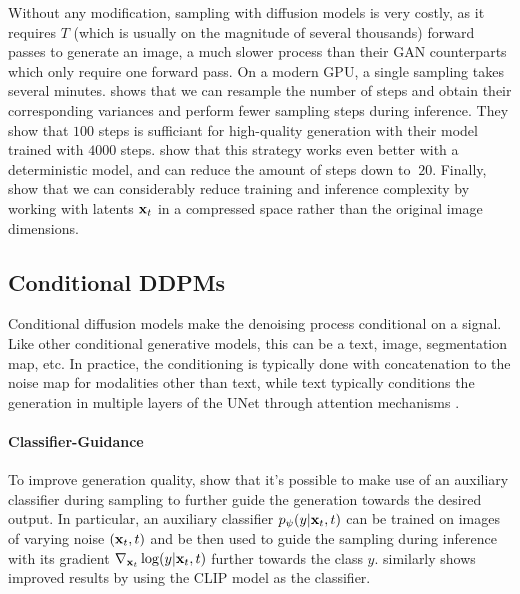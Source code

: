 Without any modification, sampling with diffusion models is very costly, as it requires $T$
(which is usually on the magnitude of several thousands) forward passes to generate an image, a much slower 
process than their \ac{GAN} counterparts which only require one forward pass. On a modern 
GPU, a single sampling takes several minutes. \cite{nichol2021improved} shows that we can 
resample the number of steps and obtain their corresponding variances and perform fewer 
sampling steps during inference. They show that $100$  steps is sufficiant for high-quality 
generation with their model trained with $4000$ steps. \cite{song2021denoising} show that 
this strategy works even better with a deterministic model, and can reduce the amount of steps
down to $~20$. Finally, \cite{rombach2022high} show that we can considerably reduce training and 
inference complexity by working with latents $\mathbf{x}_t$ in a compressed space rather than 
the original image dimensions.

\subsection{Conditional DDPMs}\label{subsection:conditional_ddpm}

Conditional diffusion models \citep{chen2021wavegrad, saharia2022image, saharia2022palette}
make the denoising process conditional on a signal. Like other conditional generative models, 
this can be  a text, image, segmentation map, etc. In practice, the conditioning is 
typically done with concatenation to the noise map for modalities other than text, 
while text typically conditions the generation in multiple layers of the 
UNet through attention mechanisms \citep{nichol2021glide, rombach2022high, saharia2022photorealistic}.

\paragraph{Classifier-Guidance}
To improve generation quality, \cite{sohl2015deep, song2020score, dhariwal2021diffusion} show that 
it's possible to make use of an auxiliary classifier
during sampling to further guide the generation towards the desired output. 
In particular, an auxiliary classifier $p_\psi(y|\mathbf{x}_t, t)$ can be trained on images of varying noise 
$(\mathbf{x}_t, t)$ 
and be then used to guide the sampling during inference with its gradient 
 $\nabla_{\mathbf{x}_t} \log(y|\mathbf{x}_t, t) $ further towards the class $y$. 
 \cite{nichol2021glide} similarly shows improved results by using the CLIP \citep{radford2021learning}
 model as the classifier.

